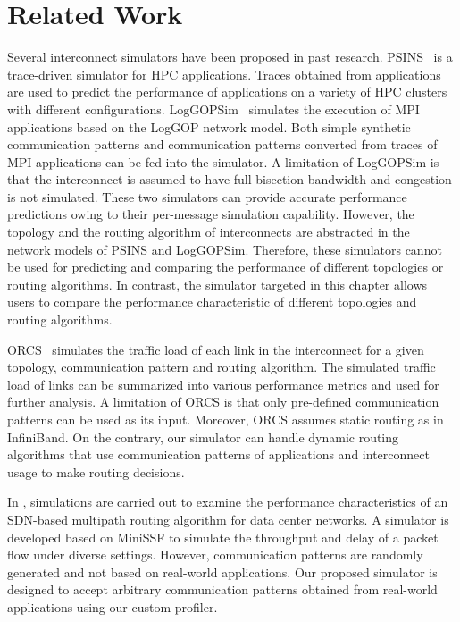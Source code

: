 \section{Related Work}\label{sec:ii-related-work}

Several interconnect simulators have been proposed in past research.
PSINS~\autocite{Tikir2009} is a trace-driven simulator for HPC
applications. Traces obtained from applications are used to predict the
performance of applications on a variety of HPC clusters with different
configurations. LogGOPSim~\autocite{Hoefler2010} simulates the execution
of MPI applications based on the LogGOP network model. Both simple
synthetic communication patterns and communication patterns converted
from traces of MPI applications can be fed into the simulator. A
limitation of LogGOPSim is that the interconnect is assumed to have full
bisection bandwidth and congestion is not simulated. These two
simulators can provide accurate performance predictions owing to their
per-message simulation capability. However, the topology and the routing
algorithm of interconnects are abstracted in the network models of PSINS
and LogGOPSim. Therefore, these simulators cannot be used for predicting
and comparing the performance of different topologies or routing
algorithms. In contrast, the simulator targeted in this chapter allows
users to compare the performance characteristic of different topologies
and routing algorithms.

ORCS~\autocite{Schneider2009} simulates the traffic load of each link in
the interconnect for a given topology, communication pattern and routing
algorithm. The simulated traffic load of links can be summarized into
various performance metrics and used for further analysis. A limitation
of ORCS is that only pre-defined communication patterns can be used as
its input. Moreover, ORCS assumes static routing as in InfiniBand. On
the contrary, our simulator can handle dynamic routing algorithms that
use communication patterns of applications and interconnect usage to
make routing decisions.

In \autocite{Jo2015}, simulations are carried out to examine the
performance characteristics of an SDN-based multipath routing algorithm
for data center networks. A simulator is developed based on MiniSSF to
simulate the throughput and delay of a packet flow under diverse
settings. However, communication patterns are randomly generated and not
based on real-world applications. Our proposed simulator is designed to
accept arbitrary communication patterns obtained from real-world
applications using our custom profiler.

